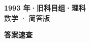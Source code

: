 \documentclass[zihao=-4, a4paper]{ctexart}
\begin{document}
\begin{center}
  {\Large\bfseries 1993 年·旧科目组·理科}\\[4pt]
  {\large 数学 · 简答版}
\end{center}
\medskip
{}

\clearpage
{}
\begin{center}{\Large\bfseries 答案速查}\end{center}
\medskip

\end{document}
